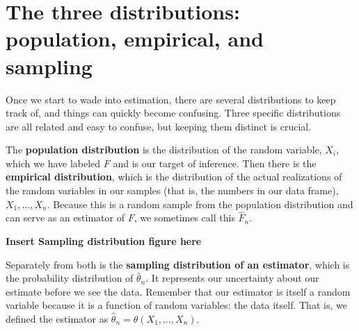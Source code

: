 \documentclass[
  letterpaper,
  DIV=11,
  numbers=noendperiod]{scrreprt}
\theoremstyle{definition}
\theoremstyle{plain}
\theoremstyle{definition}
\theoremstyle{remark}
\begin{document}
\hypertarget{the-three-distributions-population-empirical-and-sampling}{%
\section{The three distributions: population, empirical, and
sampling}\label{the-three-distributions-population-empirical-and-sampling}}

Once we start to wade into estimation, there are several distributions
to keep track of, and things can quickly become confusing. Three
specific distributions are all related and easy to confuse, but keeping
them distinct is crucial.

The \textbf{population distribution} is the distribution of the random
variable, \(X_i\), which we have labeled \(F\) and is our target of
inference. Then there is the \textbf{empirical distribution}, which is
the distribution of the actual realizations of the random variables in
our samples (that is, the numbers in our data frame),
\(X_1, \ldots, X_n\). Because this is a random sample from the
population distribution and can serve as an estimator of \(F\), we
sometimes call this \(\widehat{F}_n\).

\textbf{Insert Sampling distribution figure here}

Separately from both is the \textbf{sampling distribution of an
estimator}, which is the probability distribution of
\(\widehat{\theta}_n\). It represents our uncertainty about our estimate
before we see the data. Remember that our estimator is itself a random
variable because it is a function of random variables: the data itself.
That is, we defined the estimator as
\(\widehat{\theta}_n = \theta(X_1, \ldots, X_n)\).
\end{document}
